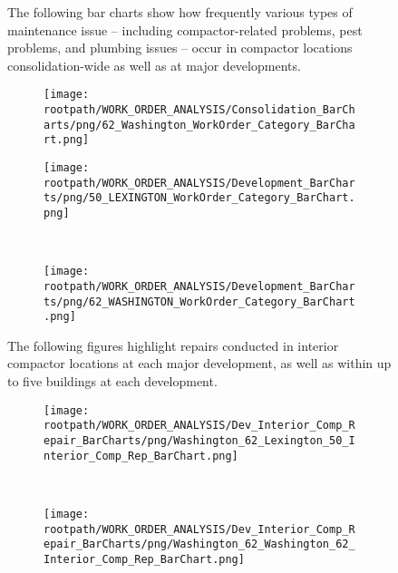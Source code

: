 \begin{figure}[h]
                                \sf
                                The following bar charts show how frequently various types of maintenance issue -- including compactor-related problems, pest problems, and plumbing issues -- occur in compactor locations consolidation-wide as well as at major developments.
                                \raggedright
                                \begin{subfigure}{\textwidth}
                                \texttt{[image: \\rootpath/WORK\_ORDER\_ANALYSIS/Consolidation\_BarCharts/png/62\_Washington\_WorkOrder\_Category\_BarChart.png]}
                                \end{subfigure}
                                
                                        \begin{subfigure}{0.45\textwidth}
                                        \texttt{[image: \\rootpath/WORK\_ORDER\_ANALYSIS/Development\_BarCharts/png/50\_LEXINGTON\_WorkOrder\_Category\_BarChart.png]}
                                        \end{subfigure}
                                        ~
                                        \begin{subfigure}{0.45\textwidth}
                                        \texttt{[image: \\rootpath/WORK\_ORDER\_ANALYSIS/Development\_BarCharts/png/62\_WASHINGTON\_WorkOrder\_Category\_BarChart.png]}
                                        \end{subfigure}
                                        
                                        \end{figure}
\begin{figure}[h]
                                \raggedright
                                \sf
                                The following figures highlight repairs conducted in interior compactor locations at each major development, as well as within up to five buildings at each development.\\
                                \begin{subfigure}{0.45\textwidth}
                                        \texttt{[image: \\rootpath/WORK\_ORDER\_ANALYSIS/Dev\_Interior\_Comp\_Repair\_BarCharts/png/Washington\_62\_Lexington\_50\_Interior\_Comp\_Rep\_BarChart.png]}
                                        \end{subfigure}
                                        ~
                                        \begin{subfigure}{0.45\textwidth}
                                        \texttt{[image: \\rootpath/WORK\_ORDER\_ANALYSIS/Dev\_Interior\_Comp\_Repair\_BarCharts/png/Washington\_62\_Washington\_62\_Interior\_Comp\_Rep\_BarChart.png]}
                                        \end{subfigure}
                                        
                                        
\end{figure}
